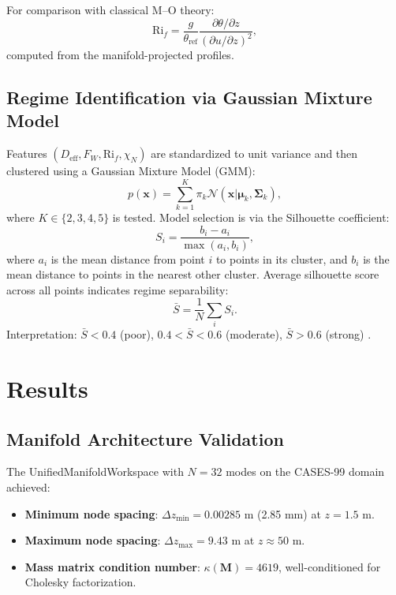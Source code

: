 \documentclass[11pt,a4paper]{article}
\begin{document}
For comparison with classical M--O theory:
\begin{equation}
\mathrm{Ri}_f = \frac{g}{\theta_{\mathrm{ref}}} \frac{\partial \theta / \partial z}{(\partial u / \partial z)^2},
\label{eq:rif}
\end{equation}
computed from the manifold-projected profiles.

\subsection{Regime Identification via Gaussian Mixture Model}
\label{sec:methods:clustering}

Features $(D_{\mathrm{eff}}, F_W, \mathrm{Ri}_f, \chi_N)$ are standardized to unit variance and then clustered using a Gaussian Mixture Model (GMM):
\begin{equation}
p(\mathbf{x}) = \sum_{k=1}^{K} \pi_k \mathcal{N}(\mathbf{x} | \boldsymbol{\mu}_k, \boldsymbol{\Sigma}_k),
\end{equation}
where $K \in \{2, 3, 4, 5\}$ is tested. Model selection is via the Silhouette coefficient:
\begin{equation}
S_i = \frac{b_i - a_i}{\max(a_i, b_i)},
\end{equation}
where $a_i$ is the mean distance from point $i$ to points in its cluster, and $b_i$ is the mean distance to points in the nearest other cluster. Average silhouette score across all points indicates regime separability:
\begin{equation}
\bar{S} = \frac{1}{N} \sum_i S_i.
\end{equation}
Interpretation: $\bar{S} < 0.4$ (poor), $0.4 < \bar{S} < 0.6$ (moderate), $\bar{S} > 0.6$ (strong) \citep{Rousseeuw1987}.


\section{Results}
\label{sec:results}

\subsection{Manifold Architecture Validation}
\label{sec:results:manifold}

The UnifiedManifoldWorkspace with $N = 32$ modes on the CASES-99 domain achieved:
\begin{itemize}
  \item \textbf{Minimum node spacing}: $\Delta z_{\min} = 0.00285$ m (2.85 mm) at $z = 1.5$ m.
  \item \textbf{Maximum node spacing}: $\Delta z_{\max} = 9.43$ m at $z \approx 50$ m.
  \item \textbf{Mass matrix condition number}: $\kappa(\mathbf{M}) = 4619$, well-conditioned for Cholesky factorization.
\end{itemize}
\end{document}

